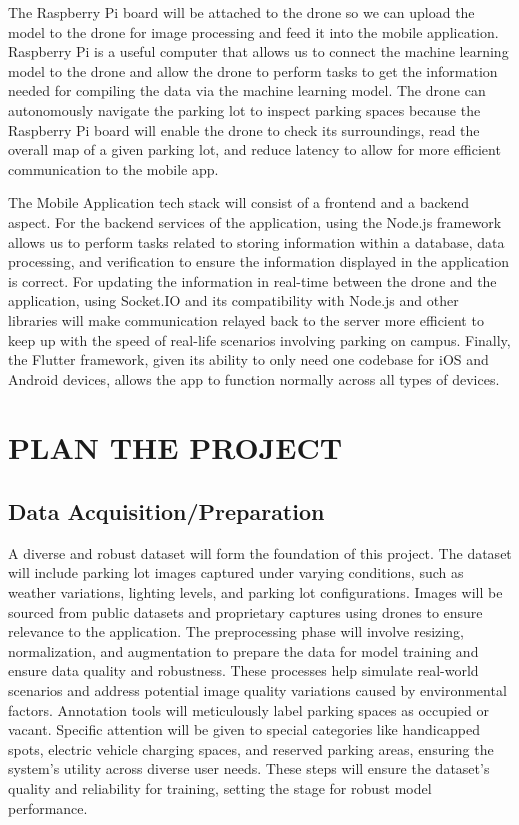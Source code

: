 \documentclass[conference]{IEEEtran}
\begin{document}
The Raspberry Pi board will be attached to the drone so we can upload the model to the drone for image processing and feed it into the mobile application. 
Raspberry Pi is a useful computer that allows us to connect the machine learning model to the drone and allow the drone to perform tasks to get the information needed for compiling the data via the machine learning model. 
The drone can autonomously navigate the parking lot to inspect parking spaces because the Raspberry Pi board will enable the drone to check its surroundings, 
read the overall map of a given parking lot, 
and reduce latency to allow for more efficient communication to the mobile app.

The Mobile Application tech stack will consist of a frontend and a backend aspect. 
For the backend services of the application, 
using the Node.js framework allows us to perform tasks related to storing information within a database, 
data processing, 
and verification to ensure the information displayed in the application is correct. 
For updating the information in real-time between the drone and the application, 
using Socket.IO and its compatibility with Node.js and other libraries will make communication relayed back to the server more efficient to keep up with the speed of real-life scenarios involving parking on campus. 
Finally, 
the Flutter framework, 
given its ability to only need one codebase for iOS and Android devices, 
allows the app to function normally across all types of devices. 

\section{PLAN THE PROJECT}

\subsection{Data Acquisition/Preparation}

A diverse and robust dataset will form the foundation of this project. 
The dataset will include parking lot images captured under varying conditions, 
such as weather variations, 
lighting levels, 
and parking lot configurations. 
Images will be sourced from public datasets and proprietary captures using drones to ensure relevance to the application. 
The preprocessing phase will involve resizing, 
normalization, 
and augmentation to prepare the data for model training and ensure data quality and robustness. 
These processes help simulate real-world scenarios and address potential image quality variations caused by environmental factors. 
Annotation tools will meticulously label parking spaces as occupied or vacant. 
Specific attention will be given to special categories like handicapped spots, 
electric vehicle charging spaces, 
and reserved parking areas, 
ensuring the system’s utility across diverse user needs. 
These steps will ensure the dataset’s quality and reliability for training, 
setting the stage for robust model performance.
\end{document}
